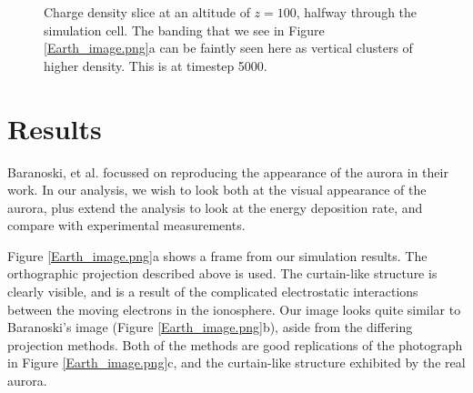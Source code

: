 \documentclass[twocolumn]{article}
\renewcommand{\insertfigure}[3]{\begin{figure}[tbh]
\centering
	\makebox[\columnwidth][c]{
	\texttt{[image: \#1]}
	}
\caption{#3}
\label{#1}
\end{figure}}
\newcommand{\insertfigurewide}[3]{\begin{figure*}[bth]
\centering
	\makebox[\columnwidth][c]{
	\texttt{[image: \#1]}
	}
\caption{#3}
\label{#1}
\end{figure*}}
\begin{document}
\insertfigure{../presentation/img/charge_density.pdf}{1.0}{Charge density slice at an altitude of $z=100$, halfway through the simulation cell. The banding that we see in Figure \ref{Earth_image.png}a can be faintly seen here as vertical clusters of higher density.  This is at timestep 5000.}

\section*{Results}

\insertfigurewide{Earth_image.png}{2.0}{(a) A single frame from a simulation of Earth's aurora using the methods explained above, rendered through an orthographic projection.  (b) Simulation results from Baranoski, et al. [\citen{Baranoski2005}] who used a perspective projection. (c) Photograph of aurora borealis curtains.}


Baranoski, et al. focussed on reproducing the appearance of the aurora in their work. In our analysis, we wish to look both at the visual appearance of the aurora, plus extend the analysis to look at the energy deposition rate, and compare with experimental measurements.

Figure \ref{Earth_image.png}a shows a frame from our simulation results.  The orthographic projection described above is used.  The curtain-like structure is clearly visible, and is a result of the complicated electrostatic interactions between the moving electrons in the ionosphere.  Our image looks quite similar to Baranoski's image (Figure \ref{Earth_image.png}b), aside from the differing projection methods.  Both of the methods are good replications of the photograph in Figure \ref{Earth_image.png}c, and the curtain-like structure exhibited by the real aurora.
\end{document}
